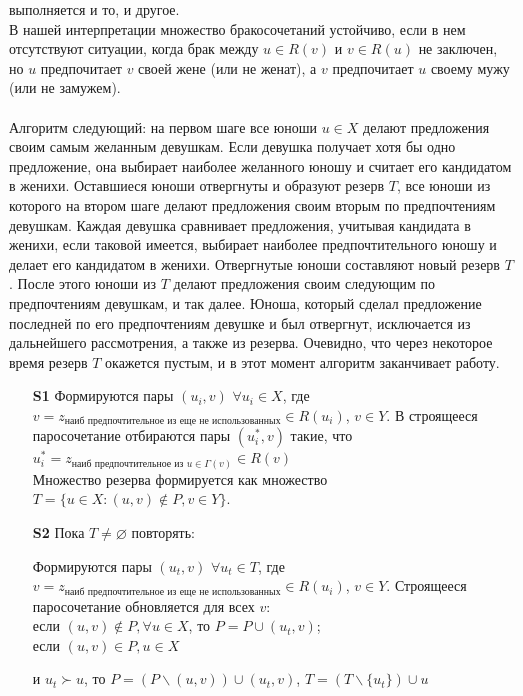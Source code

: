\documentclass{article}
\begin{document}
\begin{enumerate}
\qquad{} выполняется и то, и другое.\\
В нашей интерпретации множество бракосочетаний устойчиво, если в нем отсутствуют ситуации, когда брак между $u \in R(v)$ и $v \in R(u)$
не заключен, но $u$ предпочитает $v$ своей жене (или не женат), а 
$v$ предпочитает $u$ своему мужу (или не замужем).\\
\\
Алгоритм следующий: на первом шаге все юноши
$u \in X$ делают предложения своим самым желанным девушкам. Если девушка получает хотя бы одно предложение, она выбирает наиболее желанного юношу и считает его кандидатом в женихи. Оставшиеся юноши отвергнуты и образуют резерв $T$, все юноши из которого на втором шаге
делают предложения своим вторым по предпочтениям девушкам. Каждая девушка сравнивает предложения, учитывая кандидата в женихи, если таковой имеется, выбирает наиболее предпочтительного юношу и делает его кандидатом в женихи. Отвергнутые юноши составляют новый резерв $T$.
После этого юноши из $T$ делают предложения своим следующим по предпочтениям девушкам, и так далее.
Юноша, который сделал предложение последней по его предпочтениям девушке и был отвергнут, исключается из
дальнейшего рассмотрения, а также из резерва. Очевидно, что через некоторое время резерв $T$ окажется пустым, и в этот момент алгоритм заканчивает работу.
\begin{enumerate}
    \item[\textbf{S1}] Формируются пары $(u_i,v)$  $\forall u_i \in X$, где $v = z_\text{наиб предпочтительное из еще не использованных} \in R(u_i)$, $v \in Y$. В строящееся паросочетание отбираются пары $(u_i^*, v)$ такие, что $u_i^* = z_{\text{наиб предпочтительное из }u \in\Gamma(v)} \in R(v)$\\
    Множество резерва формируется как множество $T = \{u\in X: (u,v) \not\in P, v \in Y\}$. 

    \item[\textbf{S2}] Пока $T \neq \varnothing$ повторять:
    
    Формируются пары $(u_t,v)$  $\forall u_t \in T$, где $v = z_\text{наиб предпочтительное из еще не использованных} \in R(u_i)$, $v \in Y$. Строящееся паросочетание обновляется для всех $v$:\\
    если $(u, v) \not\in P, \forall u \in X$, то $P = P \cup (u_t, v)$;\\
    
    если $(u, v) \in P, u \in X$
    
    \qquad\qquad и $u_t \succ u$, то $P = (P\backslash(u, v)) \cup (u_t, v)$, $T = (T\backslash \{u_t\}) \cup {u}$


\end{enumerate}
\end{enumerate}
\end{document}
